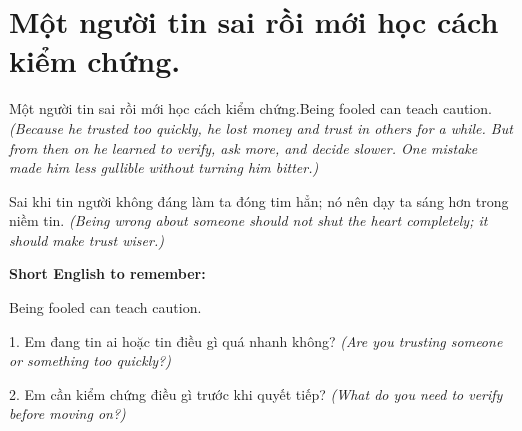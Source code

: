 \section{Một người tin sai rồi mới học cách kiểm chứng.}
\begin{truyen}{Một người tin sai rồi mới học cách kiểm chứng.}{Being fooled can teach caution.}
\textit{(Because he trusted too quickly, he lost money and trust in others for a while. But from then on he learned to verify, ask more, and decide slower. One mistake made him less gullible without turning him bitter.)}
\end{truyen}
\begin{baihoc}
Sai khi tin người không đáng làm ta đóng tim hẳn; nó nên dạy ta sáng hơn trong niềm tin.
\textit{(Being wrong about someone should not shut the heart completely; it should make trust wiser.)}
\end{baihoc}
\begin{ghinhoanh}\textbf{Short English to remember:}

Being fooled can teach caution.
\end{ghinhoanh}
\begin{tuhocnhanh}
1. Em đang tin ai hoặc tin điều gì quá nhanh không? \textit{(Are you trusting someone or something too quickly?)}

2. Em cần kiểm chứng điều gì trước khi quyết tiếp? \textit{(What do you need to verify before moving on?)}
\end{tuhocnhanh}
\ngancach